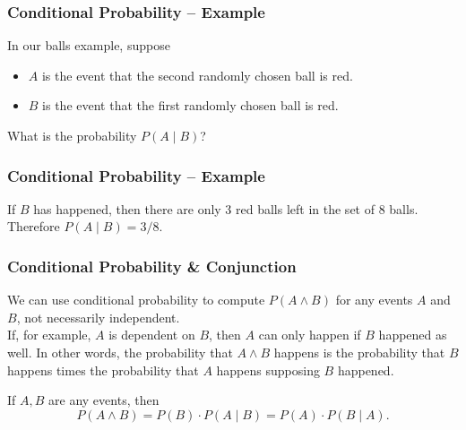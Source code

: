 \documentclass[aspectratio=169,11pt,usenames,dvipsnames,handout]{beamer}
\begin{document}
\begin{frame}
 \frametitle{Conditional Probability -- Example}
 \begin{center}
 \end{center}
 In our balls example, suppose
 \begin{itemize}
  \item $A$ is the event that the \alert{second} randomly chosen ball is red.
  \item $B$ is the event that the \alert{first} randomly chosen ball is red.
 \end{itemize}
 \pause
 What is the probability $P(A \mid B)$?
\end{frame}

\begin{frame}
 \frametitle{Conditional Probability -- Example}
 \begin{center}
 \end{center}
 If $B$ has happened, then there are only 3 red balls left in the set of 8
 balls.\pause\\
 Therefore $P(A \mid B) = 3 / 8$.
\end{frame}

\begin{frame}
 \frametitle{Conditional Probability \& Conjunction}
 We can use conditional probability to compute $P(A \wedge B)$ for \alert{any}
 events $A$ and $B$, not necessarily independent.\pause\\
 If, for example, $A$ is dependent on $B$, then $A$ can \alert{only happen if
 $B$ happened as well}. \pause
 In other words, the probability that $A \wedge B$ happens is the probability
 that $B$ happens times the probability that $A$ happens \alert{supposing $B$
 happened}.
 \pause
 \begin{tcolorbox}[title=Event Conjunction Formula]
  If $A,B$ are \alert{any} events, then
  \[
   P(A \wedge B) = P(B) \cdot P(A \mid B) = P(A) \cdot P(B \mid A).
  \]
 \end{tcolorbox}
\end{frame}
\end{document}
